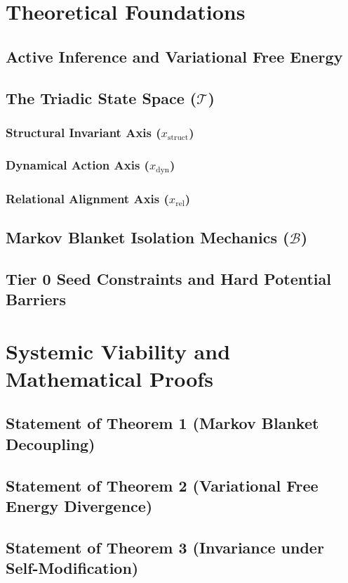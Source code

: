 \documentclass[11pt,a4paper]{article}
\begin{document}
\section{Theoretical Foundations}
\label{sec:foundations}
\subsection{Active Inference and Variational Free Energy}
\subsection{The Triadic State Space ($\mathcal{T}$)}
\subsubsection{Structural Invariant Axis ($x_{\text{struct}}$)}
\subsubsection{Dynamical Action Axis ($x_{\text{dyn}}$)}
\subsubsection{Relational Alignment Axis ($x_{\text{rel}}$)}
\subsection{Markov Blanket Isolation Mechanics ($\mathcal{B}$)}
\subsection{Tier 0 Seed Constraints and Hard Potential Barriers}

\section{Systemic Viability and Mathematical Proofs}
\label{sec:proofs_summary}
\subsection{Statement of Theorem 1 (Markov Blanket Decoupling)}
\subsection{Statement of Theorem 2 (Variational Free Energy Divergence)}
\subsection{Statement of Theorem 3 (Invariance under Self-Modification)}
\end{document}
